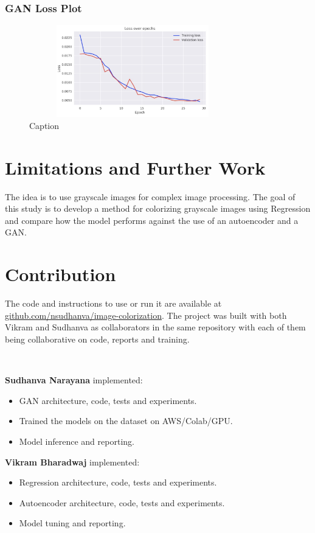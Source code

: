 \documentclass{article}
\begin{document}
\subsubsection{GAN Loss Plot}

\begin{figure}[h]
\begin{center}
    \includegraphics[width=9cm, height=4cm]{encoder-decoder-plot.jpg}
    \caption{Caption}
\end{center}
\end{figure}

\pagebreak
\section{Limitations and Further Work}
The idea is to use grayscale images for complex image processing. The goal of this
study is to develop a method for colorizing grayscale images using Regression and
compare how the model performs against the use of an autoencoder and a GAN. 

\section{Contribution}

The code and instructions to use or run it are available 
at \url{github.com/nsudhanva/image-colorization}. 
The project was built with both Vikram and Sudhanva as collaborators in the same repository with each of them being collaborative on code, reports and training.

\

\textbf{Sudhanva Narayana} implemented:
\begin{itemize}
\item GAN architecture, code, tests and experiments.
\item Trained the models on the dataset on AWS/Colab/GPU.
\item Model inference and reporting.
\end{itemize}



\textbf{Vikram Bharadwaj} implemented:
\begin{itemize}
\item Regression architecture, code, tests and experiments.
\item Autoencoder architecture, code, tests and experiments.
\item Model tuning and reporting.
\end{itemize}

\cite{1}
\cite{2}
\cite{4}
\cite{5}
\cite{6}
\cite{7}
\cite{8}


\end{document}
